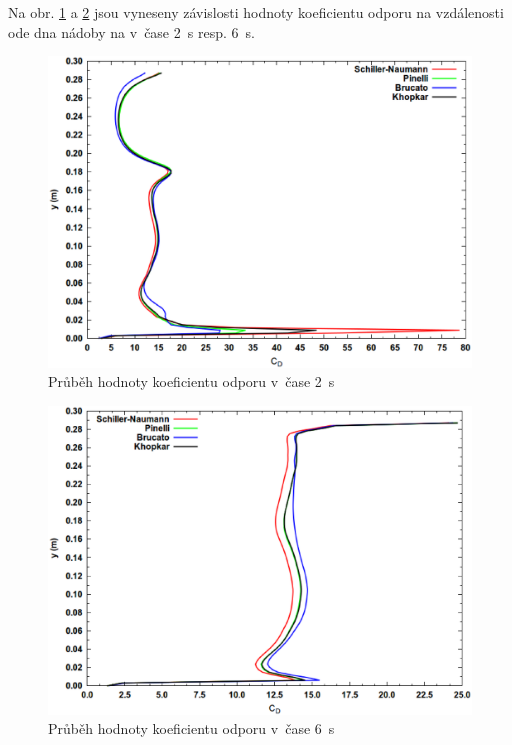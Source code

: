 
\newpage

Na obr. \ref{fig:cd2} a \ref{fig:cd6} jsou vyneseny závislosti hodnoty koeficientu odporu na vzdálenosti ode dna nádoby na v~čase \SI{2}{\second} resp. \SI{6}{\second}.

\begin{figure}[h!]
\begin{center}
\includegraphics[scale=0.47]{images/CD-2.eps}
\caption{Průběh hodnoty koeficientu odporu v~čase \SI{2}{\second}}
\label{fig:cd2}
\end{center}
\end{figure} 

\vspace{-12mm}

\begin{figure}[h!]
\begin{center}
\includegraphics[scale=0.47]{images/CD-6.eps}
\caption{Průběh hodnoty koeficientu odporu v~čase \SI{6}{\second}}
\label{fig:cd6}
\end{center}
\end{figure} 

